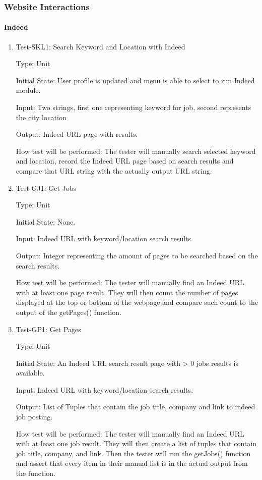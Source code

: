 \documentclass[12pt, titlepage]{article}
\makeatletter
\def\itemlabel#1#2{\def\@currentlabel{#2}\phantomsection\label{#1}}
\makeatother
\begin{document}
\subsubsection{Website Interactions}
		
\paragraph{Indeed}

\begin{enumerate}

\item{Test-SKL1: Search Keyword and Location with Indeed\\}

Type: Unit
					
Initial State: User profile is updated and menu is able to select to run Indeed module.
					
Input: Two strings, first one representing keyword for job, second represents the city location
					
Output: Indeed URL page with results.
					
How test will be performed: The tester will manually search selected keyword and location, record the Indeed URL page based on search results and compare that URL string with the actually output URL string.

\item{\itemlabel{item:GJ1}{Test-GJ1}Test-GJ1: Get Jobs\\}

Type: Unit
					
Initial State: None.
					
Input: Indeed URL with keyword/location search results.
					
Output: Integer representing the amount of pages to be searched based on the search results.
					
How test will be performed: The tester will manually find an Indeed URL with at least one page result. They will then count the number of pages displayed at the top or bottom of the webpage and compare such count to the output of the getPages() function.

\item{Test-GP1: Get Pages\\}

Type: Unit
					
Initial State: An Indeed URL search result page with > 0 jobs results is available.
					
Input: Indeed URL with keyword/location search results.
					
Output: List of Tuples that contain the job title, company and link to indeed job posting.
					
How test will be performed: The tester will manually find an Indeed URL with at least one job result. They will then create a list of tuples that contain job title, company, and link. Then the tester will run the getJobs() function and assert that every item in their manual list is in the actual output from the function.

\end{enumerate}
\end{document}
